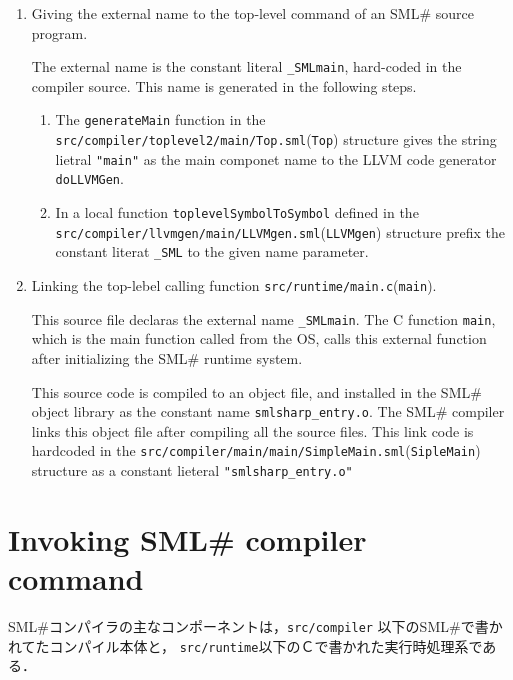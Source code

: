\documentclass{jbook}
\newcommand{\txt}[2]{#2}
\newcommand{\smlsharp}{SML\#}
\newcommand{\code}[1]{\mbox{\large\tt #1}}
\newcommand{\module}[2]{\code{#1}(\code{#2})}
\begin{document}
\begin{enumerate}
\item Giving the external name to the top-level command of an
\smlsharp{} source program.

	The external name is the constant literal \code{\_SMLmain},
hard-coded in the compiler source.
	This name is generated in the following steps.
\begin{enumerate}
\item The \code{generateMain} function in the 
\module{src/compiler/toplevel2/main/Top.sml}{Top}
structure gives the string lietral \code{"main"} as
the main componet name to the LLVM code generator 
\code{doLLVMGen}.
\item 
	In a local function \code{toplevelSymbolToSymbol} defined
in the \module{src/compiler/llvmgen/main/LLVMgen.sml}{LLVMgen} structure
prefix the constant literat \code{\_SML} to the given name parameter.
\end{enumerate}

\item Linking the top-lebel calling function \module{src/runtime/main.c}{main}.

	This source file declaras the external name \code{\_SMLmain}.
	The C function \code{main}, which is the main function called
from the OS, calls this external function after initializing 
the \smlsharp{} runtime system.

	This source code is compiled to an object file, 
and installed in the \smlsharp{} object library as the constant name
\code{smlsharp\_entry.o}.
	The \smlsharp{} compiler links this object file after compiling
all the source files.
	This link code is hardcoded in the
\module{src/compiler/main/main/SimpleMain.sml}{SipleMain}
structure as a constant lieteral \code{"smlsharp\_entry.o"}
\end{enumerate}
\fi%

\section{\txt{\smlsharp{}コンパイラコマンドの起動}{Invoking \smlsharp{} compiler command}}

\ifjp%
	\smlsharp{}コンパイラの主なコンポーネントは，\code{src/compiler}
以下の\smlsharp{}で書かれてたコンパイル本体と，
\code{src/runtime}以下のＣで書かれた実行時処理系である．
	
\end{document}
